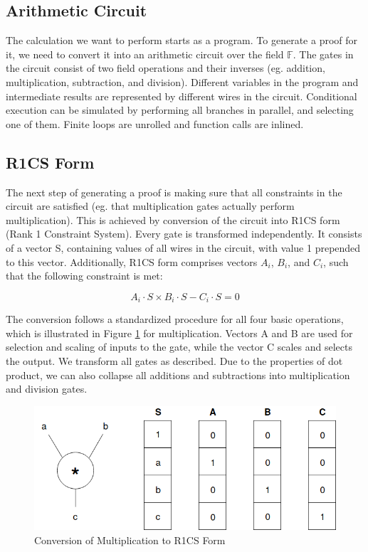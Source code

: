 \subsection{Arithmetic Circuit}

The calculation we want to perform starts as a program. To generate a proof for it, we need to convert it into an arithmetic circuit over the field $\mathbb{F}$. The gates in the circuit consist of two field operations and their inverses (eg. addition, multiplication, subtraction, and division). Different variables in the program and intermediate results are represented by different wires in the circuit. Conditional execution can be simulated by performing all branches in parallel, and selecting one of them. Finite loops are unrolled and function calls are inlined.

\subsection{R1CS Form}
The next step of generating a proof is making sure that all constraints in the circuit are satisfied (eg. that multiplication gates actually perform multiplication). This is achieved by conversion of the circuit into R1CS form (Rank 1 Constraint System). Every gate is transformed independently. It consists of a vector S, containing values of all wires in the circuit, with value 1 prepended to this vector. Additionally, R1CS form comprises vectors $A_i$, $B_i$, and $C_i$, such that the following constraint is met:

$$ A_i \cdot S \times B_i \cdot S - C_i \cdot S = 0 $$

The conversion follows a standardized procedure for all four basic operations, which is illustrated in Figure \ref{fig:r1csmul} for multiplication. Vectors A and B are used for selection and scaling of inputs to the gate, while the vector C scales and selects the output. We transform all gates as described. Due to the properties of dot product, we can also collapse all additions and subtractions into multiplication and division gates.

\begin{figure}[h]
    \includegraphics[width=\linewidth]{Figures/R1CS.png}
    \caption{Conversion of Multiplication to R1CS Form}
    \label{fig:r1csmul}
\end{figure}

